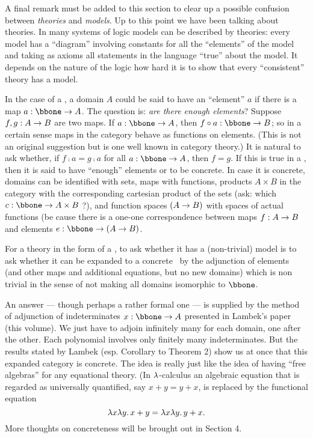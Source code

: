 A final remark must be added to this section to clear up a possible confusion between {\it
theories} and {\it models}. Up to this point we have been talking about theories. In many
systems of logic models can be described by theories: every model has a ``diagram''
involving constants for all the ``elements'' of the model and taking as axioms all
statements in the language ``true'' about the model. It depends on the nature of the
logic how hard it is to show that every ``consistent'' theory has a model.

In the case of a \ccc, a domain $A$ could be said to have an ``element'' $a$ if there is a
map $a: \bbone \to A$. The question is: {\it are there enough elements}? Suppose $f,g:
A \rightarrow B$ are two maps. If $a : \bbone \to A$, then $f \comp a: \bbone \to B$; so in a certain
sense maps in the category behave as functions on elements. (This is not an original
suggestion but is one well known in category theory.) It is natural to ask whether, if  $f
\comp a = g\comp a$ for all $a : \bbone \to A$, then $f = g$. If this is true in a \ccc,
then it is said to have ``enough'' elements or to be concrete. In case it is concrete,
domains can be identified with sets, maps with functions, products $A \times B$ in the
category with the corresponding cartesian product of the sets (ask: which $c : \bbone \to
A \times B$ ?), and function spaces $(A \rightarrow B)$ with spaces of actual functions (be cause
there is a one-one correspondence between maps $f : A \rightarrow B$ and elements $e: \bbone \to
(\AB)$.

For a theory in the form of a \ccc, to ask whether it has a (non-trivial) model is to ask
whether it can be expanded to a concrete \ccc\ by the adjunction of elements (and other
maps and additional equations, but no new domains) which is non trivial in the sense of
not making all domains isomorphic to $\bbone$.

An answer --- though perhaps a rather formal one --- is supplied by the method of
adjunction of indeterminates $x: \bbone \to A$ presented in Lambek's paper (this volume).
We just have to adjoin infinitely many for each domain, one after the other. Each
polynomial involves only finitely many indeterminates. But the results stated by Lambek
(esp. Corollary to Theorem 2) show us at once that this expanded category is concrete. The
idea is really just like the idea of having ``free algebras'' for any equational theory.
(In $\lambda$-calculus an algebraic equation that is regarded as universally quantified, say $x
+ y = y + x$, is replaced by the functional equation
$$
\lambda x \lambda y . \, x + y = \lambda x \lambda y . \, y + x.
$$
%
More thoughts on concreteness will be brought out in Section 4.

